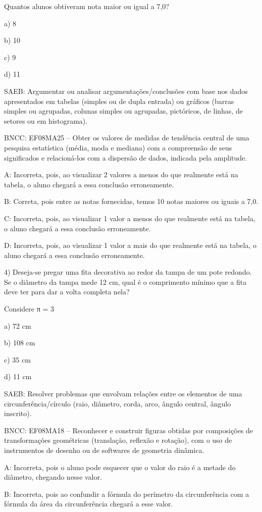 Quantos alunos obtiveram nota maior ou igual a 7,0?

a) 8

b) 10

c) 9

d) 11

SAEB: Argumentar ou analisar argumentações/conclusões com base nos dados
apresentados em tabelas (simples ou de dupla entrada) ou gráficos
(barras simples ou agrupadas, colunas simples ou agrupadas, pictóricos,
de linhas, de setores ou em histograma).

BNCC: EF08MA25 -- Obter os valores de medidas de tendência central de
uma pesquisa estatística (média, moda e mediana) com a compreensão de
seus significados e relacioná-los com a dispersão de dados, indicada
pela amplitude.

A: Incorreta, pois, ao visualizar 2 valores a menos do que realmente
está na tabela, o aluno chegará a essa conclusão erroneamente.

B: Correta, pois entre as notas fornecidas, temos 10 notas maiores ou
iguais a 7,0.

C: Incorreta, pois, ao visualizar 1 valor a menos do que realmente está
na tabela, o aluno chegará a essa conclusão erroneamente.

D: Incorreta, pois, ao visualizar 1 valor a mais do que realmente está
na tabela, o aluno chegará a essa conclusão erroneamente.

4) Deseja-se pregar uma fita decorativa ao redor da tampa de um pote
redondo. Se o diâmetro da tampa mede 12 cm, qual é o comprimento mínimo
que a fita deve ter para dar a volta completa nela?

Considere π = 3

a) 72 cm

b) 108 cm

c) 35 cm

d) 11 cm

SAEB: Resolver problemas que envolvam relações entre os elementos de uma
circunferência/círculo (raio, diâmetro, corda, arco, ângulo central,
ângulo inscrito).

BNCC: EF08MA18 -- Reconhecer e construir figuras obtidas por composições
de transformações geométricas (translação, reflexão e rotação), com o
uso de instrumentos de desenho ou de softwares de geometria dinâmica.

A: Incorreta, pois o aluno pode esquecer que o valor do raio é a metade
do diâmetro, chegando nesse valor.

B: Incorreta, pois ao confundir a fórmula do perímetro da circunferência
com a fórmula da área da circunferência chegará a esse valor.

